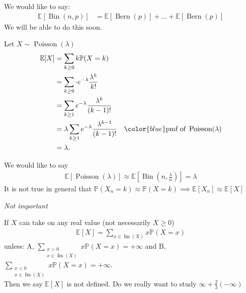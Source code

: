 \begin{note}
    We would like to say:
    \begin{align*}
        \mathbb{E}[\operatorname{Bin}(n, p)] &= \mathbb{E}[\operatorname{Bern}(p)] + \dots + \mathbb{E}[\operatorname{Bern}(p)]
    \end{align*} 
    We will be able to do this soon.
\end{note} 

\begin{example}
    Let $X \sim \operatorname{Poisson}(\lambda)$
    \begin{align*}
        \mathbb{E}[X] &= \sum_{k \geq 0} k \mathbb{P}(X = k) \\
        &= \sum_{k \geq 0} \cdot e^{-\lambda} \frac{\lambda^k}{k!} \\
        &= \sum_{k \geq 1} e^{-\lambda} \frac{\lambda^k}{(k - 1)!} \\
        &= \lambda \sum_{k \geq 1} e^{-\lambda} \frac{\lambda^{k - 1}}{(k - 1)!} \quad \color{blue} \text{pmf of } \operatorname{Poisson}(\lambda) \\
        &= \lambda.
    \end{align*} 
\end{example} 

\begin{note}
    We would like to say
    \begin{align*}
        \mathbb{E}[\operatorname{Poisson}(\lambda)] \approx \mathbb{E}\left[\operatorname{Bin}\left(n, \frac{\lambda}{n}\right)\right] = \lambda
    \end{align*} 
    \color{blue} It is not true in general that $\mathbb{P}(X_n = k) \approx \mathbb{P}(X = k) \implies \mathbb{E}[X_n] \approx \mathbb{E}[X]$
\end{note} 

\emph{Not important}

If $X$ can take on any real value (not necessarily $X \geq 0$)
\begin{align*}
    \mathbb{E}[X] = \sum_{x \in \operatorname{Im}(X)} x \mathbb{P}(X = x)
\end{align*} 
unless: A, $\displaystyle \sum_{\substack{x > 0 \\ x \in \operatorname{Im}(X)}} x \mathbb{P}(X = x) = + \infty$ and B, $\displaystyle \sum_{\substack{x < 0 \\ x \in \operatorname{Im}(X)}} x \mathbb{P}(X = x) = + \infty$. \\
Then we say $\mathbb{E}[X]$ is not defined.
\color{red} Do we really want to study $\infty + \frac{2}{3} (- \infty)$

